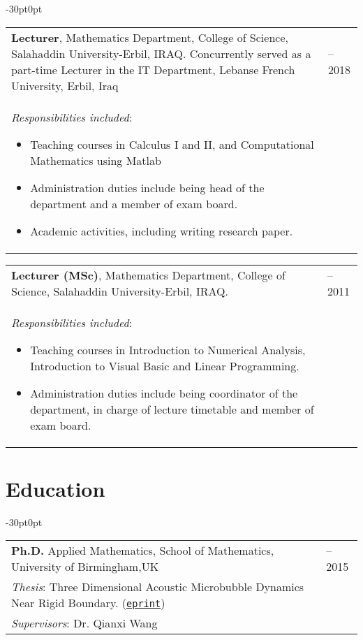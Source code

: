 \documentclass[line]{res}
\newenvironment{p1}
{\begin{adjustwidth}{-30pt}{0pt}
\vspace{8pt}}
{\end{adjustwidth}}
\begin{document}
\begin{resume}
\begin{p1}
\vspace{5pt}
\begin{tabular}{p{} >{\raggedleft\arraybackslash}p{}}
	\textbf{Lecturer}, Mathematics Department, College of Science, Salahaddin University-Erbil, IRAQ.  Concurrently served as a part-time Lecturer in the IT Department, Lebanse French University, Erbil, Iraq& 2015--2018 \\
	\textit{Responsibilities included}:
	\begin{itemize}
		\item Teaching courses in Calculus I and II, and Computational Mathematics using Matlab
		\item Administration duties include being head of the department and a member of exam board.
		\item Academic activities, including writing research paper.	
	\end{itemize}
\end{tabular}

\vspace{5pt}
\begin{tabular}{p{} >{\raggedleft\arraybackslash}p{}}
	\textbf{Lecturer (MSc)}, Mathematics Department, College of Science, Salahaddin University-Erbil, IRAQ.  & 2007--2011 \\
	\textit{Responsibilities included}:
	\begin{itemize}
		\item Teaching courses in Introduction to Numerical Analysis, Introduction to Visual Basic and Linear Programming.
		\item Administration duties include being coordinator of the department, in charge of lecture timetable and member of exam board.
	\end{itemize}
\end{tabular}
\end{p1}



\section{Education}

\begin{p1}
\begin{tabular}{p{} >{\raggedleft\arraybackslash}p{}}
	\textbf{Ph.D.} Applied Mathematics, School of Mathematics, University of Birmingham,UK & 2011--2015 \\
	\textit{Thesis}: Three Dimensional Acoustic Microbubble Dynamics Near Rigid Boundary. (\href{https://etheses.bham.ac.uk/id/eprint/5749/}{\texttt{eprint}}) & \\
	\textit{Supervisors}: Dr. Qianxi Wang & \\
\end{tabular}


\end{p1}
\end{resume}
\end{document}
